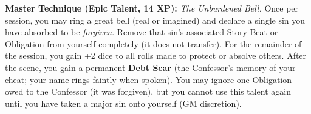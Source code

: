 \begin{tcolorbox}[colback=black!5,colframe=gray!70!black,title=\textbf{Sin-Eater (The Confessor Beneath the Bell)},breakable]
  \vspace{2mm}
  \noindent\textbf{Master Technique (Epic Talent, 14 XP):}
  \textit{The Unburdened Bell.} Once per session, you may ring a great bell (real or imagined) and declare a single sin you have absorbed to be \textit{forgiven}. Remove that sin's associated Story Beat or Obligation from yourself completely (it does not transfer). For the remainder of the session, you gain +2 dice to all rolls made to protect or absolve others. After the scene, you gain a permanent \textbf{Debt Scar} (the Confessor's memory of your cheat; your name rings faintly when spoken). You may ignore one Obligation owed to the Confessor (it was forgiven), but you cannot use this talent again until you have taken a major sin onto yourself (GM discretion).
\end{tcolorbox}